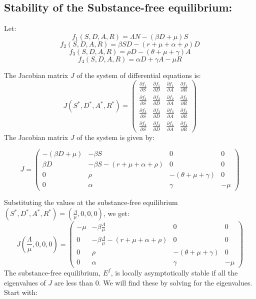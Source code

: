 \documentclass[12pt]{report}
\begin{document}
\subsection{Stability of the Substance-free equilibrium:}

Let:
\[
f_1(S,D,A,R) = \Lambda N - (\beta D + \mu)S
\]
\[
f_2(S,D,A,R) = \beta SD - (r + \mu + \alpha + \rho)D
\]
\[
f_3(S,D,A,R) = \rho D - (\theta + \mu + \gamma)A
\]
\[
f_4(S,D,A,R) = \alpha D + \gamma A - \mu R
\]

The Jacobian matrix \( J \) of the system of differential equations is:
\[
J(S^*, D^*, A^*, R^*) = \begin{pmatrix}
	\frac{\partial f_1}{\partial S} & \frac{\partial f_1}{\partial D} & \frac{\partial f_1}{\partial A} & \frac{\partial f_1}{\partial R} \\
	\frac{\partial f_2}{\partial S} & \frac{\partial f_2}{\partial D} & \frac{\partial f_2}{\partial A} & \frac{\partial f_2}{\partial R} \\
	\frac{\partial f_3}{\partial S} & \frac{\partial f_3}{\partial D} & \frac{\partial f_3}{\partial A} & \frac{\partial f_3}{\partial R} \\
	\frac{\partial f_4}{\partial S} & \frac{\partial f_4}{\partial D} & \frac{\partial f_4}{\partial A} & \frac{\partial f_4}{\partial R}
\end{pmatrix}
\]
The Jacobian matrix \( J \) of the system is given by:


\[
J = \begin{pmatrix}
	-(\beta D+\mu) & -\beta S & 0 & 0 \\
	\beta D & -\beta S - (r + \mu + \alpha + \rho) & 0 & 0 \\
	0 & \rho & -(\theta + \mu + \gamma) & 0 \\
	0 & \alpha & \gamma & -\mu
\end{pmatrix}
\]







Substituting the values at the substance-free equilibrium \( (S^*, D^*, A^*, R^*) = \left( \frac{\Lambda}{\mu}, 0, 0, 0 \right) \), we get:
\[
J\left( \frac{\Lambda}{\mu}, 0, 0, 0 \right) = \begin{pmatrix}
	-\mu & -\beta \frac{\Lambda}{\mu} & 0 & 0 \\
	0 & -\beta \frac{\Lambda}{\mu} - (r + \mu + \alpha + \rho) & 0 & 0 \\
	0 & \rho & -(\theta + \mu + \gamma) & 0 \\
	0 & \alpha & \gamma & -\mu
\end{pmatrix}
\]
The substance-free equilibrium, \( E^f \), is locally asymptotically stable if all the eigenvalues of \( J \) are less than 0. We will find these by solving for the eigenvalues. Start with:
\end{document}
